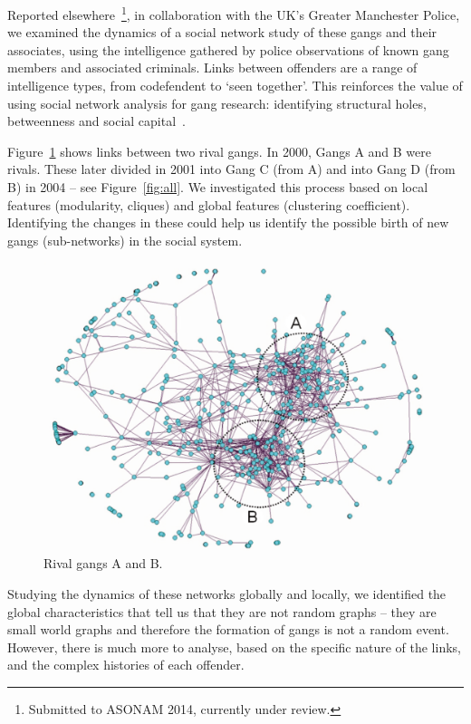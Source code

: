 \documentclass[conference]{IEEEtran}
\theoremstyle{definition}
\begin{document}
Reported elsewhere~\footnote{Submitted to ASONAM 2014, currently under
review.}, in collaboration with the UK's Greater Manchester Police, we
examined the dynamics of a social network study of these gangs and
their associates, using the intelligence gathered by police
observations of known gang members and associated criminals. Links
between offenders are a range of intelligence types, from codefendent
to `seen together'. This reinforces the value of using social network
analysis for gang research: identifying structural holes, betweenness
and social capital~\cite{papachristos:2006}.

Figure~\ref{fig:2000ganglabels} shows links between two rival gangs.  In
2000, Gangs A and B were rivals. These later divided in 2001 into Gang
C (from A) and into Gang D (from B) in 2004 -- see Figure~\ref{fig:all}. We
investigated this process based on local features (modularity,
cliques) and global features (clustering coefficient). Identifying the
changes in these could help us identify the possible birth of new
gangs (sub-networks) in the social system.

\begin{figure}[!ht] 
\centering
\includegraphics[width=\columnwidth]{images/2000ganglabels}
\caption{Rival gangs A and B.}
\label{fig:2000ganglabels}
\end{figure}

Studying the dynamics of these networks globally and locally, we
identified the global characteristics that tell us that they are not
random graphs -- they are small world graphs and therefore the
formation of gangs is not a random event. However, there is much more
to analyse, based on the specific nature of the links, and the complex
histories of each offender.
\end{document}
